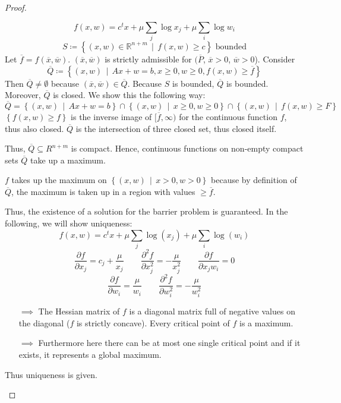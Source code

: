 \documentclass[a4paper]{article}
\numberwithin{lecref}{subsection}
\newcommand{\Set}[1]{\left\{#1\right\}}
\newcommand{\SetDef}[2]{\left\{#1\,\mid\,#2\right\}}
\begin{document}
\begin{proof}
\begin{description}
			\[ f(x, w) = c^t x + \mu \sum_j \log x_j + \mu \sum_i \log w_i \]
			\[ S \coloneqq \SetDef{(x, w) \in \mathbb R^{n + m}}{f(x, w) \geq c} \text{ bounded} \]
			Let $\overline f = f(\overline x, \overline w)$. $(\overline x, \overline w)$ is strictly admissible for $(\overline P$, $\overline x > 0$, $\overline w > 0$).
			Consider
			\[ \overline Q \coloneqq \SetDef{(x, w)}{Ax + w = b, x \geq 0, w \geq 0, f(x, w) \geq \overline f} \]
			Then $\overline Q \neq \emptyset$ because $(\overline x, \overline w) \in \overline Q$. Because $S$ is bounded, $\overline Q$ is bounded.
			Moreover, $\overline Q$ is closed. We show this the following way:
			\[ \overline Q = \SetDef{(x, w)}{Ax + w = b} \cap \SetDef{(x, w)}{x \geq 0, w \geq 0} \cap \SetDef{(x, w)}{f(x, w) \geq F} \]
			$\Set{f(x, w) \geq f}$ is the inverse image of $[\overline f, \infty)$ for the continuous function $f$, thus also closed.
			$\overline Q$ is the intersection of three closed set, thus closed itself.

			Thus, $\overline Q \subseteq R^{n + m}$ is compact.
			Hence, continuous functions on non-empty compact sets $\overline Q$ take up a maximum.

			$f$ takes up the maximum on $\SetDef{(x, w)}{x > 0, w > 0}$ because by definition of $\overline Q$, the maximum is taken up in a region with values $\geq \overline f$.

			Thus, the existence of a solution for the barrier problem is guaranteed.
			In the following, we will show uniqueness:
			\[ f(x, w) = c^t x + \mu \sum_j \log(x_j) + \mu \sum_i \log(w_i) \]
			\[ \frac{\partial f}{\partial x_j} = c_j + \frac{\mu}{x_j}  \qquad  \frac{\partial^2 f}{\partial x_j^2} = -\frac{\mu}{x_j^2} \qquad \frac{\partial f}{\partial x_j w_i} = 0 \]
			\[ \frac{\partial f}{\partial w_i} = \frac{\mu}{w_i} \qquad \frac{\partial^2 f}{\partial w_i^2} = -\frac{\mu}{w_i^2} \]
			\begin{itemize}
				\item[$\implies$] The Hessian matrix of $f$ is a diagonal matrix full of negative values on the diagonal ($f$ is strictly concave). Every critical point of $f$ is a maximum.
				\item[$\implies$] Furthermore here there can be at most one single critical point and if it exists, it represents a global maximum.
			\end{itemize}
			Thus uniqueness is given.
	\end{description}
\end{proof}
\end{document}
